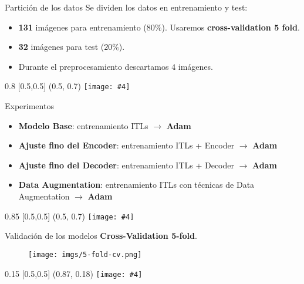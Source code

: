 \documentclass[aspectratio=43]{beamer}
\newcommand{\absimage}[4][0.5,0.5]{%
	\begin{textblock}{#3}%
		[#1]%
		(#2)%
		\texttt{[image: \#4]}%
\end{textblock}}
\begin{document}
\begin{frame}[t]{Partición de los datos}
  Se dividen los datos en entrenamiento y test:
  \begin{itemize}
      \item \textbf{131} imágenes para entrenamiento ($80\%$). Usaremos \textbf{cross-validation 5 fold}.
      \item \textbf{32} imágenes para test ($20\%$).
      \item Durante el preprocesamiento descartamos $4$ imágenes.
  \end{itemize}

  \absimage{0.5, 0.7}{0.8}{imgs/Particion_Datos.png}
\end{frame}

\begin{frame}[t]{Experimentos}
  \begin{itemize}
    \item \small \textbf{Modelo Base}: entrenamiento ITLs $\rightarrow$ \textbf{Adam}
    \item \small \textbf{Ajuste fino del Encoder}: entrenamiento ITLs + Encoder $\rightarrow$ \textbf{Adam}
    \item \small \textbf{Ajuste fino del Decoder}: entrenamiento ITLs + Decoder $\rightarrow$ \textbf{Adam}
    \item \small \textbf{Data Augmentation}: entrenamiento ITLs con técnicas de Data Augmentation $\rightarrow$ \textbf{Adam}
  \end{itemize}

  \absimage{0.5, 0.7}{0.85}{imgs/EsquemaModelos.png}
\end{frame}

\begin{frame}[t]{Validación de los modelos}
  \textbf{Cross-Validation 5-fold}.
  \begin{figure}
    \centering
    \texttt{[image: imgs/5-fold-cv.png]}
  \end{figure}

  \absimage{0.87, 0.18}{0.15}{imgs/entrenamiento.png}
\end{frame}
\end{document}
